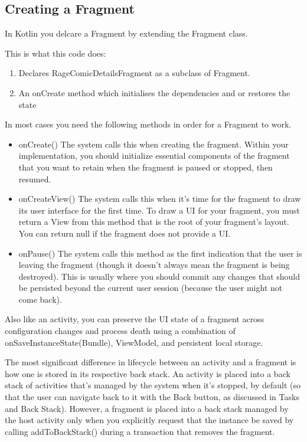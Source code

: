 \subsection{Creating a Fragment}
In Kotlin you delcare a Fragment by extending the Fragment class. 


This is what this code does:
\begin{enumerate}
	\item Declares RageComicDetailsFragment as a subclass of Fragment.
	\item An onCreate method which initialises the dependencies and or restores the state
\end{enumerate}

In most cases you need the following methods in order for a Fragment to work.

\begin{itemize}
	\item onCreate()
	The system calls this when creating the fragment. Within your implementation, you should initialize essential components of the fragment that you want to retain when the fragment is paused or stopped, then resumed.
	\item onCreateView()
	The system calls this when it's time for the fragment to draw its user interface for the first time. To draw a UI for your fragment, you must return a View from this method that is the root of your fragment's layout. You can return null if the fragment does not provide a UI.
	\item onPause()
	The system calls this method as the first indication that the user is leaving the fragment (though it doesn't always mean the fragment is being destroyed). This is usually where you should commit any changes that should be persisted beyond the current user session (because the user might not come back).
\end{itemize}
Also like an activity, you can preserve the UI state of a fragment across configuration changes and process death using a combination of onSaveInstanceState(Bundle), ViewModel, and persistent local storage. 

The most significant difference in lifecycle between an activity and a fragment is how one is stored in its respective back stack. An activity is placed into a back stack of activities that's managed by the system when it's stopped, by default (so that the user can navigate back to it with the Back button, as discussed in Tasks and Back Stack). However, a fragment is placed into a back stack managed by the host activity only when you explicitly request that the instance be saved by calling addToBackStack() during a transaction that removes the fragment.


